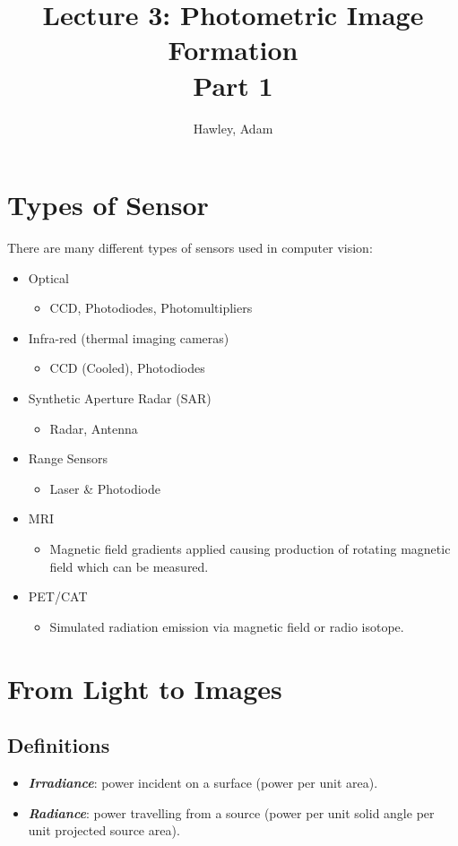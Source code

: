 \documentclass{article}
\author{Hawley, Adam}
\title{Lecture 3: Photometric Image Formation\\Part 1}
\begin{document}
\maketitle
\tableofcontents
\newpage

\section{Types of Sensor}
There are many different types of sensors used in computer vision:
\begin{itemize}
	\item Optical
	\begin{itemize} \item CCD, Photodiodes, Photomultipliers \end{itemize}
	\item Infra-red (thermal imaging cameras)
	\begin{itemize} \item CCD (Cooled), Photodiodes \end{itemize}
	\item Synthetic Aperture Radar (SAR)
	\begin{itemize} \item Radar, Antenna \end{itemize}
	\item Range Sensors
	\begin{itemize} \item Laser \& Photodiode \end{itemize}
	\item MRI
	\begin{itemize} \item Magnetic field gradients applied causing production of rotating magnetic field which can be measured. \end{itemize}
	\item PET/CAT
	\begin{itemize} \item Simulated radiation emission via magnetic field or radio isotope. \end{itemize}
\end{itemize}
\section{From Light to Images}
\subsection{Definitions}
\begin{itemize}
	\item {\textit{\textbf {Irradiance}}}: power incident on a surface (power per unit area).
	\item {\textit{\textbf {Radiance}}}: power travelling from a source (power per unit solid angle per unit projected source area).
\end{itemize}
\end{document}
